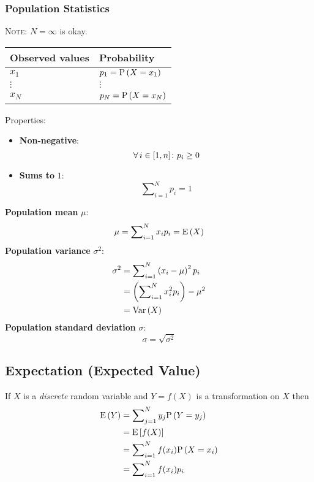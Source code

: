 \subsubsection*{Population Statistics}

\textsc{Note}: $N = \infty$ is okay.
\begin{table}[H]
    \centering
    \begin{tabularx}{\linewidth}{@{}Y|Y@{}}
        \toprule
        Observed values & Probability \\
        \midrule
        $x_1$ & $p_1 = \mathrm{P} \left( X = x_1 \right)$ \\
        $\vdots$ & $\vdots$ \\
        $x_N$ & $p_N = \mathrm{P} \left( X = x_N \right)$ \\
        \bottomrule
    \end{tabularx}
\end{table}
Properties:
\begin{itemize}
    \item \textbf{Non-negative}:
    \begin{equation*}
        \operatorname{\forall} i \in [1, n] \colon p_i \ge 0
    \end{equation*}
    \item \textbf{Sums to} $1$:
    \begin{equation*}
        \sum \nolimits_{i = 1}^{N} p_i = 1
    \end{equation*}
\end{itemize}
\textbf{Population mean} $\mu$:
\begin{equation*}
    \mu = \sum \nolimits_{i = 1}^{N} x_i p_i = \mathrm{E} \left( X \right)
\end{equation*}
\textbf{Population variance} $\sigma^2$:
\begin{align*}
    \sigma^2
    &= \sum \nolimits_{i = 1}^{N} \left( x_i - \mu \right)^2 p_i \\
    &= \left(  \sum \nolimits_{i = 1}^{N} x_i^2 p_i \right) - \mu^2 \\
    &= \mathrm{Var} \left( X \right)
\end{align*}
\textbf{Population standard deviation} $\sigma$:
\begin{equation*}
    \sigma = \sqrt{\sigma^2}
\end{equation*}

\subsection*{Expectation (Expected Value)}

If $X$ is a \textit{discrete} random variable and $Y = f(X)$ is a transformation on $X$ then
\begin{align*}
    \mathrm{E} \left( Y \right)
    &= \sum \nolimits_{j = 1}^{N} y_j \mathrm{P} \left( Y = y_j \right)  \\
    &= \mathrm{E} \left[ f(X) \right]\\
    &= \sum \nolimits_{i = 1}^{N} f(x_i) \mathrm{P} \left( X = x_i \right) \\
    &= \sum \nolimits_{i = 1}^{N} f(x_i) p_i
\end{align*}

